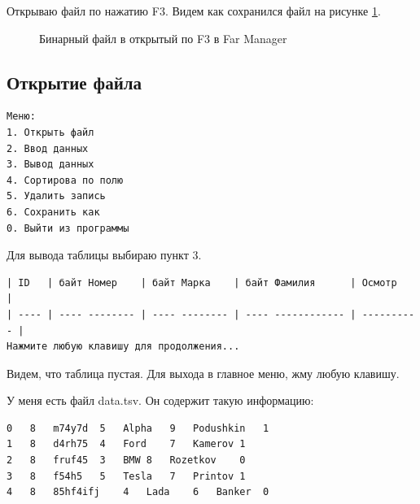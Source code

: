 Открываю файл по нажатию F3. Видем как сохранился файл на рисунке \ref{fig:far_data_bin}.

\begin{figure}[p]
    \caption{Бинарный файл в открытый по F3 в Far Manager}
    \label{fig:far_data_bin}
\end{figure}

\newpage

\subsection{Открытие файла}

\begin{tcolorbox}
\begin{verbatim}
Меню:
1. Открыть файл      
2. Ввод данных       
3. Вывод данных      
4. Сортирова по полю 
5. Удалить запись    
6. Сохранить как     
0. Выйти из программы
\end{verbatim}
\end{tcolorbox}

Для вывода таблицы выбираю пункт 3.

\begin{tcolorbox}
\begin{verbatim}
| ID   | байт Номер    | байт Марка    | байт Фамилия      | Осмотр     |
| ---- | ---- -------- | ---- -------- | ---- ------------ | ---------- |
Нажмите любую клавишу для продолжения...
\end{verbatim}
\end{tcolorbox}

Видем, что таблица пустая. Для выхода в главное меню, жму любую клавишу.

У меня есть файл data.tsv. Он содержит такую информацию:
\begin{tcolorbox}
\begin{verbatim}
0	8	m74y7d	5	Alpha	9	Podushkin	1
1	8	d4rh75	4	Ford	7	Kamerov	1
2	8	fruf45	3	BMW	8	Rozetkov	0
3	8	f54h5	5	Tesla	7	Printov	1
4	8	85hf4ifj	4	Lada	6	Banker	0    
\end{verbatim}
\end{tcolorbox}

